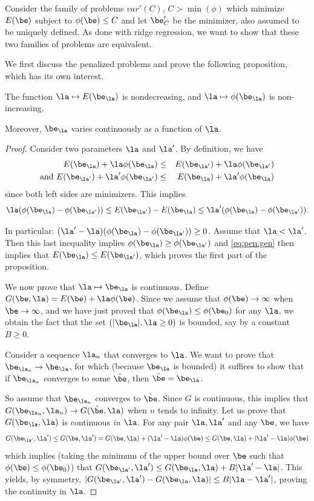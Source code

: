 Consider the family of problems $\mathit{var}'(C)$, $C>\min(\phi)$ which minimize
$E(\be)$ subject to $\phi(\be) \leq C$ and let $\be'_C$ be the
minimizer, also assumed to be uniquely defined. As done with ridge
regression, we want to show that these
two families of problems are equivalent.

We first discuss the penalized problems and prove the following
proposition, which has its own interest.
\begin{proposition}
\label{prop:pen.prop}
The function $\la \mapsto E(\be_\la)$ is nondecreasing, and
$\la\mapsto \phi(\be_\la)$ is non-increasing.

Moreover, $\be_\la$ varies continuously as a function of $\la$.
\end{proposition} 
\begin{proof}
Consider two parameters $\la$ and $\la'$. By definition, we have
\begin{eqnarray*}
E(\be_\la) + \la \phi(\be_\la) &\leq& E(\be_{\la'}) + \la
\phi(\be_{\la'})\\
\text{and } E(\be_{\la'}) + \la'
\phi(\be_{\la'}) &\leq& E(\be_\la) + \la' \phi(\be_\la) 
\end{eqnarray*}
since both left sides are minimizers. This implies
\begin{equation}
\label{eq:pen.gen}
\la (\phi(\be_\la) - \phi(\be_{\la'})) \leq E(\be_{\la'}) - E(\be_{\la})
\leq \la' (\phi(\be_\la) - \phi(\be_{\la'})).
\end{equation}

In particular: $(\la'-\la) (\phi(\be_\la) - \phi(\be_{\la'})) \geq
0$. Assume that $\la < \la'$. Then this last inequality implies
$\phi(\be_\la) \geq \phi(\be_{\la'})$ and \eqref{eq:pen.gen} then
implies that $E(\be_\la) \leq E(\be_{\la'})$, which proves the first
part of the proposition.

We now prove that $\la \mapsto \be_\la$ is continuous.
Define $G(\be,
\la)  = E(\be) + \la\phi(\be)$. 
Since we assume that $\phi(\be)\to\infty$ when $\be\to \infty$, and we
have just proved that $\phi(\be_\la) \leq \phi(\be_0)$ for any $\la$,
we obtain the fact that the set $(|\be_\la|, \la\geq 0)$ is bounded, say by a
constant $B\geq 0$. 

Consider a sequence $\la_n$ that converges to $\la$. We want to prove
that $\be_{\la_n} \to \be_\la$, for which (because $\be_\la$ is bounded)
it suffices to show that if $\be_{\la_n}$ converges to some
$\tilde \be$, then $\tilde \be = \be_\la$.

So assume that  $\be_{\la_n}$ converges to $\tilde \be$. Since 
$G$ is continuous, this implies that $G(\be_{\la_n}, \la_n) \to G(\tilde\be , \la)$ when $n$ tends
to infinity. Let us prove that $G(\be_\la, \la)$ is continuous {\em in $\la$}.
For any pair $\la, \la'$ and any $\be$, we have
$$
G(\be_{\la'}, \la')\leq G(\be, \la') = G(\be, \la) + (\la'-\la) \phi(\be) \leq G(\be, \la) + 
|\la'-\la| \phi(\be)
$$
which implies (taking the minimum of the upper bound over $\be$ such
that $\phi(\be) \leq \phi(\be_0)$) that $G(\be_{\la'}, \la') \leq
G(\be_\la, \la) + B|\la'-\la|$. This yields, by symmetry,
$|G(\be_{\la'}, \la') - G(\be_\la, \la)| \leq B|\la-\la'|$, proving
the continuity in $\la$.


\end{proof}
